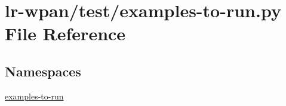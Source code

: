 \hypertarget{lr-wpan_2test_2examples-to-run_8py}{}\section{lr-\/wpan/test/examples-\/to-\/run.py File Reference}
\label{lr-wpan_2test_2examples-to-run_8py}
\subsection*{Namespaces}
\begin{DoxyCompactItemize}
\item 
 \hyperlink{namespaceexamples-to-run}{examples-\/to-\/run}
\end{DoxyCompactItemize}
